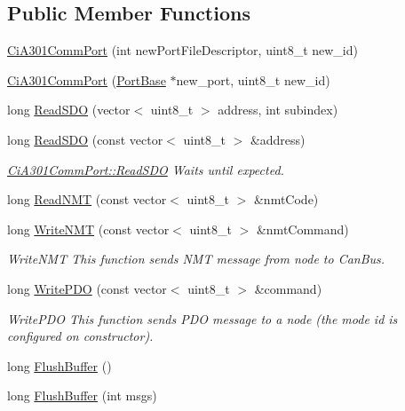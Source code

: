 \subsection*{Public Member Functions}
\begin{DoxyCompactItemize}
\item 
\hyperlink{classCiA301CommPort_aae705cb5c6a405ef74a10e5220d0b08f}{Ci\+A301\+Comm\+Port} (int new\+Port\+File\+Descriptor, uint8\+\_\+t new\+\_\+id)
\item 
\hyperlink{classCiA301CommPort_a1e05c4b292cfee36ff9eeddb2c8eb4c0}{Ci\+A301\+Comm\+Port} (\hyperlink{classPortBase}{Port\+Base} $\ast$new\+\_\+port, uint8\+\_\+t new\+\_\+id)
\item 
long \hyperlink{classCiA301CommPort_a0fd0920052684589bc37bb898dcdd758}{Read\+S\+DO} (vector$<$ uint8\+\_\+t $>$ address, int subindex)
\item 
long \hyperlink{classCiA301CommPort_a3f74ce5899b30731322dabd352ccdc55}{Read\+S\+DO} (const vector$<$ uint8\+\_\+t $>$ \&address)
\begin{DoxyCompactList}\small\item\em \hyperlink{classCiA301CommPort_a0fd0920052684589bc37bb898dcdd758}{Ci\+A301\+Comm\+Port\+::\+Read\+S\+DO} Waits until expected. \end{DoxyCompactList}\item 
long \hyperlink{classCiA301CommPort_a02df85ed5140d0d7a57fe0d2f6e47ea1}{Read\+N\+MT} (const vector$<$ uint8\+\_\+t $>$ \&nmt\+Code)
\item 
long \hyperlink{classCiA301CommPort_a09feb3f78831c9fbb683a85cc3bc4562}{Write\+N\+MT} (const vector$<$ uint8\+\_\+t $>$ \&nmt\+Command)
\begin{DoxyCompactList}\small\item\em Write\+N\+MT This function sends N\+MT message from node to Can\+Bus. \end{DoxyCompactList}\item 
long \hyperlink{classCiA301CommPort_a56d2c604b11363e6b287f59b68a546bd}{Write\+P\+DO} (const vector$<$ uint8\+\_\+t $>$ \&command)
\begin{DoxyCompactList}\small\item\em Write\+P\+DO This function sends P\+DO message to a node (the mode id is configured on constructor). \end{DoxyCompactList}\item 
long \hyperlink{classCiA301CommPort_a067cddaf01932fa6fa27255c61b08190}{Flush\+Buffer} ()
\item 
long \hyperlink{classCiA301CommPort_ab29e221039a2d21d1446edb09b91864e}{Flush\+Buffer} (int msgs)

\end{DoxyCompactItemize}
